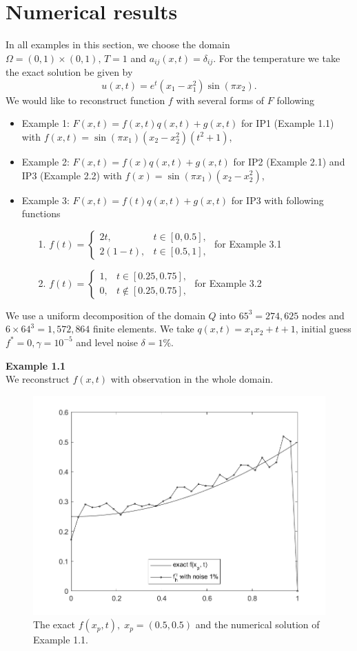 \documentclass[]{article}
\begin{document}
\section{Numerical results}\label{section5}
In all examples in this section, we choose the domain $\Omega=(0, 1)\times(0, 1),\, T=1$ and $a_{ij}(x, t)=\delta_{ij}$.
For the temperature we take the exact solution be given by
$$u(x, t)=e^t(x_1-x_1^2)\sin(\pi x_2).$$
We would like to reconstruct function $f$ with several forms of $F$ following
\begin{itemize}
	\item Example 1: $F(x, t)=f(x, t)q(x, t)+g(x, t)$ for IP1 (Example 1.1) with $f(x, t)=\sin(\pi x_1)(x_2-x_2^2)(t^2+1)$,
	\item Example 2: $F(x, t)=f(x)q(x, t)+g(x, t)$ for IP2 (Example 2.1) and IP3 (Example 2.2) with $f(x)=\sin(\pi x_1)(x_2-x_2^2)$,
	\item Example 3: $F(x, t)=f(t)q(x, t)+g(x, t)$ for IP3 with following functions
	\begin{itemize}
		\item[1.]$f(t)=
		\begin{cases}
		2t, & t\in [0, 0.5],\\
		2(1-t), & t \in [0.5, 1],
		\end{cases}$ \qquad for Example 3.1
		\item[2.] $f(t)=
		\begin{cases}
		1, & t\in [0.25, 0.75],\\
		0, & t \notin [0.25, 0.75],
		\end{cases}$ \qquad for Example 3.2
	\end{itemize}
\end{itemize}
We use a uniform decomposition of the domain $Q$ into $65^3=274,625$ nodes and $6\times 64^3=1,572,864$ finite elements. We take $q(x, t)=x_1x_2+t+1$, initial guess $f^*=0, \gamma=10^{-5}$ and level noise $\delta =1\%$.

\newpage
\noindent\textbf{Example 1.1}
\\
We reconstruct $f(x, t)$ with observation in the whole domain.
\begin{figure}[h!]
	\centering
	\includegraphics[width=.5\linewidth]{../Csharp/Results/HS_Q_fxt}
	\caption{The exact $f(x_p, t),\; x_p=(0.5, 0.5)$ and the numerical solution of Example 1.1.}
\end{figure}
\end{document}
